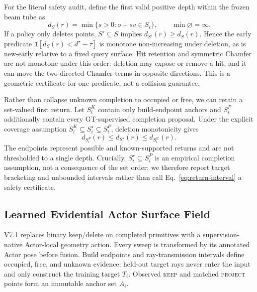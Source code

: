 For the literal safety audit, define the first valid positive depth within the frozen beam tube as
\begin{equation}
d_S(r)=\min\{s>0:o+sv\in S_{\epsilon}\},\qquad \min\varnothing=\infty.
\label{eq:first-return}
\end{equation}
If a policy only deletes points, $S'\subseteq S$ implies $d_{S'}(r)\ge d_S(r)$. Hence the early predicate
$\mathbf 1[d_S(r)<d^\star-\tau]$ is monotone non-increasing under deletion, as is new-early relative to a fixed query surface.
Hit retention and symmetric Chamfer are not monotone under this order: deletion may expose or remove a hit, and it can move the two
directed Chamfer terms in opposite directions. This is a geometric certificate for one predicate, not a collision guarantee.

Rather than collapse unknown completion to occupied or free, we can retain a set-valued first return. Let $S_i^K$ contain only build-endpoint anchors and $S_i^P$ additionally contain every GT-supervised completion proposal. Under the explicit coverage assumption $S_i^K\subseteq S_i^\star\subseteq S_i^P$, deletion monotonicity gives
\begin{equation}
d_{S_i^P}(r)\le d_{S_i^\star}(r)\le d_{S_i^K}(r).
\label{eq:return-interval}
\end{equation}
The endpoints represent possible and known-supported returns and are not thresholded to a single depth. Crucially, $S_i^\star\subseteq S_i^P$ is an empirical completion assumption, not a consequence of the set order; we therefore report target bracketing and unbounded intervals rather than call Eq.~\ref{eq:return-interval} a safety certificate.

\subsection{Learned Evidential Actor Surface Field}

V7.1 replaces binary keep/delete on completed primitives with a supervision-native Actor-local geometry action. Every sweep is
transformed by its annotated Actor pose before fusion. Build endpoints and ray-transmission intervals define occupied, free, and
unknown evidence; held-out target rays never enter the input and only construct the training target $T_i$. Observed \textsc{keep}
and matched \textsc{project} points form an immutable anchor set $A_i$.

